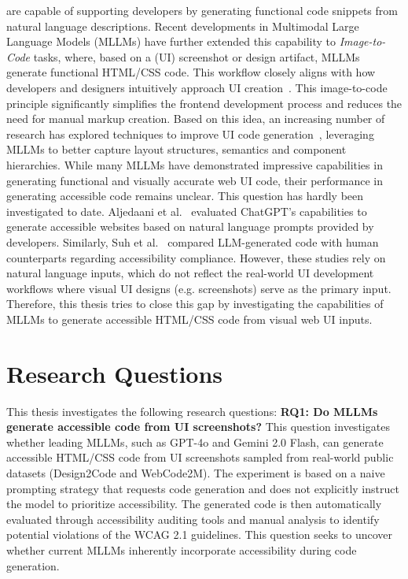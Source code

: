 are capable of supporting developers by generating functional code 
snippets from natural language descriptions. Recent developments in 
Multimodal Large Language Models (MLLMs) have further extended this capability to
\textit{Image-to-Code} tasks, where, based on a (UI) screenshot or design 
artifact,
MLLMs generate functional HTML/CSS code. This workflow closely aligns 
with how developers and designers intuitively approach UI
creation~\cite{chen2018ui,feng2022auto}. This image-to-code 
principle significantly simplifies the frontend development process and 
reduces the need for manual markup creation. Based on this idea,
an increasing number of research has explored techniques to improve 
UI code generation~\cite{cali2025prototype,mowar2025codea11y,wu2025ui2code}, 
leveraging MLLMs to better capture layout structures, semantics 
and component hierarchies. 
\newline While many MLLMs have demonstrated impressive capabilities 
in generating functional and visually accurate web UI code, 
their performance in generating accessible code remains unclear.
This question has hardly been investigated to date. 
Aljedaani et al.~\cite{aljedaani2024chatgpt} evaluated ChatGPT's
capabilities to generate accessible websites based on natural 
language prompts provided by developers. Similarly, Suh et 
al.~\cite{suh2025accessiblecode} compared LLM-generated code
with human counterparts regarding accessibility compliance.
However, these studies rely on natural language inputs, which do
not reflect the real-world UI development workflows where visual 
UI designs (e.g. screenshots) serve as the primary input. Therefore,
this thesis tries to close this gap by investigating the capabilities 
of MLLMs to generate accessible HTML/CSS code from visual web 
UI inputs. 

\section{Research Questions}
This thesis investigates the following research questions: 
\newline\newline
\textbf{RQ1: Do MLLMs generate accessible code from UI screenshots?}
This question investigates whether leading MLLMs, such as GPT-4o and 
Gemini 2.0 Flash, can generate accessible HTML/CSS code from UI 
screenshots sampled from real-world public datasets (Design2Code and 
WebCode2M). The experiment is based on a naive prompting strategy 
that requests code generation and does not explicitly instruct 
the model to prioritize accessibility. The generated code is 
then automatically evaluated through accessibility auditing tools and 
manual analysis to identify potential violations of the WCAG 2.1
guidelines. This question seeks to uncover whether current MLLMs
inherently incorporate accessibility during 
code generation.\newline

